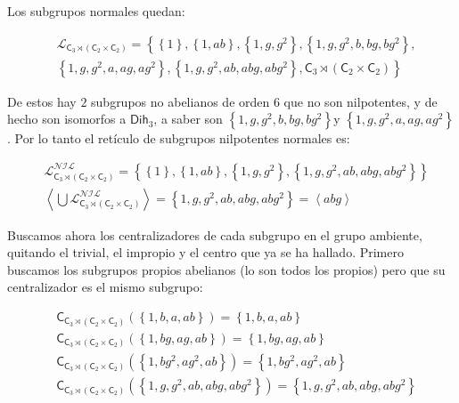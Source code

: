 \documentclass[12pt,a4paper,fleqn,spanish,final,openright]{extbook}
\theoremstyle{definition}
\theoremstyle{remark}
\begin{document}
Los subgrupos normales quedan:

\begin{align*}
&{\mathcal{L}}_{{{\mathsf{C}}_{3}}\rtimes
{\left({
{{\mathsf{C}}_{2}}   \times   {{\mathsf{C}}_{2}}
}\right)}}=
{\left\lbrace\right.}
{\left\lbrace{1}\right\rbrace},
{\left\lbrace{1,ab}\right\rbrace},
{\left\lbrace{1,g,g^2}\right\rbrace},
{\left\lbrace{1,g,g^2,b,bg,bg^2}\right\rbrace},\\
&{\left\lbrace{1,g,g^2,a,ag,ag^2}\right\rbrace},
{\left\lbrace{1,g,g^2,ab,abg,abg^2}\right\rbrace},
{{\mathsf{C}}_{3}}
\rtimes
{\left({
{{\mathsf{C}}_{2}}   \times   {{\mathsf{C}}_{2}}
}\right)}
{\left.\right\rbrace}
\end{align*}

De estos hay $2$ subgrupos no abelianos de orden $6$ que no son nilpotentes, y de hecho son isomorfos a $\mathsf{Dih}_{3}$, a saber son ${\left\lbrace{1,g,g^2,b,bg,bg^2}\right\rbrace}$y ${\left\lbrace{1,g,g^2,a,ag,ag^2}\right\rbrace}$. Por lo tanto el retículo de subgrupos nilpotentes normales es:

\begin{align*}
&{\mathcal{L}}_{{{\mathsf{C}}_{3}}\rtimes
{\left({
{{\mathsf{C}}_{2}}   \times   {{\mathsf{C}}_{2}}
}\right)}}^{\mathcal{NIL}}=
\left\lbrace
{\left\lbrace{1}\right\rbrace},
{\left\lbrace{1,ab}\right\rbrace},
{\left\lbrace{1,g,g^2}\right\rbrace},
{\left\lbrace{1,g,g^2,ab,abg,abg^2}\right\rbrace}
\right\rbrace\\
&\left\langle{\bigcup{\mathcal{L}}_{{{\mathsf{C}}_{3}}\rtimes
{\left({
{{\mathsf{C}}_{2}}   \times   {{\mathsf{C}}_{2}}
}\right)}}^{\mathcal{NIL}}}\right\rangle = {\left\lbrace{1,g,g^2,ab,abg,abg^2}\right\rbrace} = \left\langle abg \right\rangle
\end{align*}

Buscamos ahora los centralizadores de cada subgrupo en el grupo ambiente, quitando el trivial, el impropio y el centro que ya se ha hallado.
Primero buscamos los subgrupos propios abelianos (lo son todos los propios) pero que su centralizador es el mismo subgrupo:

\begin{align*}
&\mathsf{C}_{{\mathsf{C}_{3}}\rtimes({\mathsf{C}_{2}}   \times   {\mathsf{C}_{2}})}\left({\left\lbrace{1,b,a,ab}\right\rbrace}\right) = {\left\lbrace{1,b,a,ab}\right\rbrace}\\
&\mathsf{C}_{{\mathsf{C}_{3}}\rtimes({\mathsf{C}_{2}}   \times   {\mathsf{C}_{2}})}\left({\left\lbrace{1,bg,ag,ab}\right\rbrace}\right) = {\left\lbrace{1,bg,ag,ab}\right\rbrace}\\
&\mathsf{C}_{{\mathsf{C}_{3}}\rtimes({\mathsf{C}_{2}}   \times   {\mathsf{C}_{2}})}\left({\left\lbrace{1,bg^2,ag^2,ab}\right\rbrace}\right) = {\left\lbrace{1,bg^2,ag^2,ab}\right\rbrace}\\
&\mathsf{C}_{{\mathsf{C}_{3}}\rtimes({\mathsf{C}_{2}}   \times   {\mathsf{C}_{2}})}\left({\left\lbrace{1,g,g^2,ab,abg,abg^2}\right\rbrace}\right) = {\left\lbrace{1,g,g^2,ab,abg,abg^2}\right\rbrace}
\end{align*}
\end{document}
